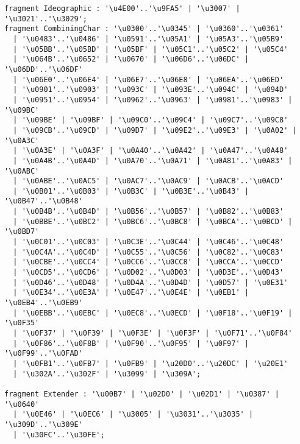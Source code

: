 \begin{Verbatim}[frame=none, fontsize=\footnotesize]
fragment Ideographic : '\u4E00'..'\u9FA5' | '\u3007' | '\u3021'..'\u3029'; 
fragment CombiningChar : '\u0300'..'\u0345' | '\u0360'..'\u0361' 
  | '\u0483'..'\u0486' | '\u0591'..'\u05A1' | '\u05A3'..'\u05B9' 
  | '\u05BB'..'\u05BD' | '\u05BF' | '\u05C1'..'\u05C2' | '\u05C4' 
  | '\u064B'..'\u0652' | '\u0670' | '\u06D6'..'\u06DC' | '\u06DD'..'\u06DF' 
  | '\u06E0'..'\u06E4' | '\u06E7'..'\u06E8' | '\u06EA'..'\u06ED' 
  | '\u0901'..'\u0903' | '\u093C' | '\u093E'..'\u094C' | '\u094D' 
  | '\u0951'..'\u0954' | '\u0962'..'\u0963' | '\u0981'..'\u0983' | '\u09BC' 
  | '\u09BE' | '\u09BF' | '\u09C0'..'\u09C4' | '\u09C7'..'\u09C8' 
  | '\u09CB'..'\u09CD' | '\u09D7' | '\u09E2'..'\u09E3' | '\u0A02' | '\u0A3C' 
  | '\u0A3E' | '\u0A3F' | '\u0A40'..'\u0A42' | '\u0A47'..'\u0A48' 
  | '\u0A4B'..'\u0A4D' | '\u0A70'..'\u0A71' | '\u0A81'..'\u0A83' | '\u0ABC' 
  | '\u0ABE'..'\u0AC5' | '\u0AC7'..'\u0AC9' | '\u0ACB'..'\u0ACD' 
  | '\u0B01'..'\u0B03' | '\u0B3C' | '\u0B3E'..'\u0B43' | '\u0B47'..'\u0B48' 
  | '\u0B4B'..'\u0B4D' | '\u0B56'..'\u0B57' | '\u0B82'..'\u0B83' 
  | '\u0BBE'..'\u0BC2' | '\u0BC6'..'\u0BC8' | '\u0BCA'..'\u0BCD' | '\u0BD7' 
  | '\u0C01'..'\u0C03' | '\u0C3E'..'\u0C44' | '\u0C46'..'\u0C48' 
  | '\u0C4A'..'\u0C4D' | '\u0C55'..'\u0C56' | '\u0C82'..'\u0C83' 
  | '\u0CBE'..'\u0CC4' | '\u0CC6'..'\u0CC8' | '\u0CCA'..'\u0CCD' 
  | '\u0CD5'..'\u0CD6' | '\u0D02'..'\u0D03' | '\u0D3E'..'\u0D43' 
  | '\u0D46'..'\u0D48' | '\u0D4A'..'\u0D4D' | '\u0D57' | '\u0E31' 
  | '\u0E34'..'\u0E3A' | '\u0E47'..'\u0E4E' | '\u0EB1' | '\u0EB4'..'\u0EB9'
  | '\u0EBB'..'\u0EBC' | '\u0EC8'..'\u0ECD' | '\u0F18'..'\u0F19' | '\u0F35' 
  | '\u0F37' | '\u0F39' | '\u0F3E' | '\u0F3F' | '\u0F71'..'\u0F84' 
  | '\u0F86'..'\u0F8B' | '\u0F90'..'\u0F95' | '\u0F97' | '\u0F99'..'\u0FAD' 
  | '\u0FB1'..'\u0FB7' | '\u0FB9' | '\u20D0'..'\u20DC' | '\u20E1' 
  | '\u302A'..'\u302F' | '\u3099' | '\u309A';

fragment Extender : '\u00B7' | '\u02D0' | '\u02D1' | '\u0387' | '\u0640' 
  | '\u0E46' | '\u0EC6' | '\u3005' | '\u3031'..'\u3035' | '\u309D'..'\u309E' 
  | '\u30FC'..'\u30FE';
  
\end{Verbatim}